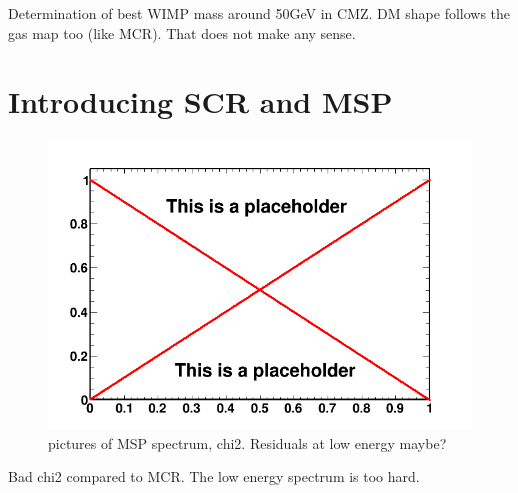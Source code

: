 Determination of best WIMP mass around 50GeV in CMZ.
DM shape follows the gas map too (like MCR). That does not make any sense.



\section{Introducing SCR and MSP}

\begin{figure}
  \centering
  \includegraphics[width=.9\linewidth]{pic/dummy.png}
  \caption{pictures of MSP spectrum, chi2. Residuals at low energy maybe?}
  \label{fig:MSPonly_fit}
\end{figure}

Bad chi2 compared to MCR. The low energy spectrum is too hard.






